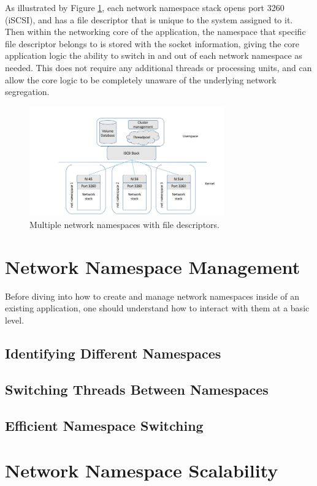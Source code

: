 \documentclass[letterpaper]{article}
\begin{document}
As illustrated by Figure \ref{namespace-fds}, each network namespace stack opens port 3260 (iSCSI), and has a file descriptor that is unique to the system assigned to it. Then within the networking core of the application, the namespace that specific file descriptor belongs to is stored with the socket information, giving the core application logic the ability to switch in and out of each network namespace as needed. This does not require any additional threads or processing units, and can allow the core logic to be completely unaware of the underlying network segregation.

\begin{figure}[h]
\includegraphics[width=3.31in]{multiple-namespaces-with-fd.png}
\caption{Multiple network namespaces with file descriptors.}
\label{namespace-fds}
\end{figure}

\section{Network Namespace Management}
Before diving into how to create and manage network namespaces inside of an existing application, one should understand how to interact with them at a basic level\cite{edge2014}.

\subsection{Identifying Different Namespaces}

\subsection{Switching Threads Between Namespaces}

\subsection{Efficient Namespace Switching}

\section{Network Namespace Scalability}
\end{document}
